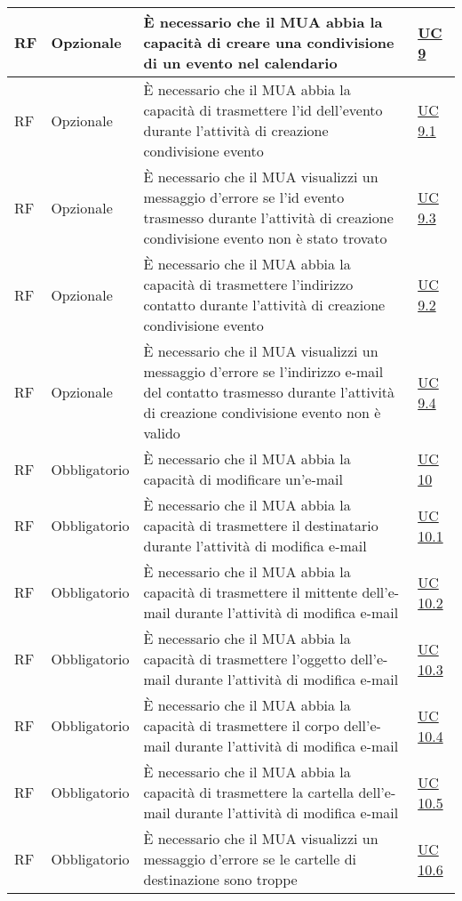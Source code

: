 \begin{longtable}{*{1}{>{\centering\arraybackslash}p{1.5cm}}*{1}{>{\centering\arraybackslash}p{2.5cm}}p{6cm}*{1}{>{\centering\arraybackslash}p{3cm}}}
    \\\hline
    RF & Opzionale & È necessario che il MUA abbia la capacità di creare una condivisione di un evento nel calendario & \hyperref[sec:UC9]{UC 9}
    \\\hline
    RF & Opzionale & È necessario che il MUA abbia la capacità di trasmettere l'id dell'evento durante l'attività di creazione condivisione evento & \hyperref[sec:UC9.1]{UC 9.1}
    \\\hline
    RF & Opzionale & È necessario che il MUA visualizzi un messaggio d'errore se l'id evento trasmesso durante l'attività di creazione condivisione evento non è stato trovato & \hyperref[sec:UC9.3]{UC 9.3}
    \\\hline
    RF & Opzionale & È necessario che il MUA abbia la capacità di trasmettere l'indirizzo contatto durante l'attività di creazione condivisione evento & \hyperref[sec:UC9.2]{UC 9.2}
    \\\hline
    RF & Opzionale & È necessario che il MUA visualizzi un messaggio d'errore se l'indirizzo e-mail del contatto trasmesso durante l'attività di creazione condivisione evento non è valido & \hyperref[sec:UC9.4]{UC 9.4}
    \\\hline
    RF & Obbligatorio & È necessario che il MUA abbia la capacità di modificare un'e-mail & \hyperref[sec:UC10]{UC 10}
    \\\hline
    RF & Obbligatorio & È necessario che il MUA abbia la capacità di trasmettere il destinatario durante l'attività di modifica e-mail & \hyperref[sec:UC10.1]{UC 10.1}
    \\\hline
    RF & Obbligatorio & È necessario che il MUA abbia la capacità di trasmettere il mittente dell'e-mail durante l'attività di modifica e-mail & \hyperref[sec:UC10.2]{UC 10.2}
    \\\hline
    RF & Obbligatorio & È necessario che il MUA abbia la capacità di trasmettere l'oggetto dell'e-mail durante l'attività di modifica e-mail & \hyperref[sec:UC10.3]{UC 10.3}
    \\\hline
    RF & Obbligatorio & È necessario che il MUA abbia la capacità di trasmettere il corpo dell'e-mail durante l'attività di modifica e-mail & \hyperref[sec:UC10.4]{UC 10.4}
    \\\hline
    RF & Obbligatorio & È necessario che il MUA abbia la capacità di trasmettere la cartella dell'e-mail durante l'attività di modifica e-mail & \hyperref[sec:UC10.5]{UC 10.5}
    \\\hline
    RF & Obbligatorio & È necessario che il MUA visualizzi un messaggio d'errore se le cartelle di destinazione sono troppe & \hyperref[sec:UC10.6]{UC 10.6}

\end{longtable}
